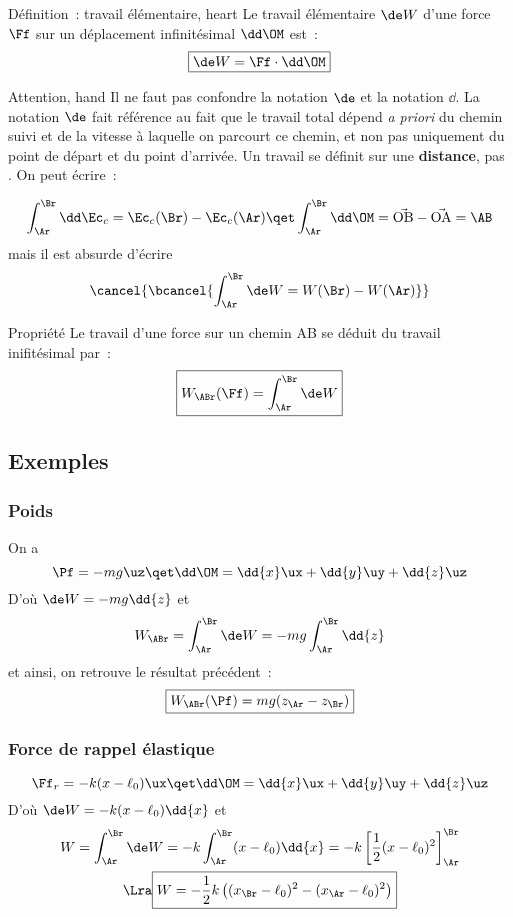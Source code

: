 \documentclass[../main/main.tex]{subfiles}
\begin{document}
\begin{tdefi}{Définition~: travail élémentaire, heart}
    Le travail élémentaire $\de W$ d'une force $\Ff$ sur un déplacement
    infinitésimal $\dd\OM$ est~:
    \[\boxed{\de W = \Ff\cdot\dd\OM}\]
\end{tdefi}

\begin{timpo}{Attention, hand}
    Il ne faut pas confondre la notation $\de$ et la notation $\dd$. \bigbreak
    La notation $\de$ fait référence au fait que le travail total dépend
    \textit{a priori} du chemin suivi et de la vitesse à laquelle on parcourt ce
    chemin, et non pas uniquement du point de départ et du point d'arrivée. Un
    travail se définit sur une \textbf{distance}, pas
    . On peut écrire~:

    \[
        \int_\Ar^\Br \dd\Ec_c = \Ec_c(\Br) - \Ec_c(\Ar)
        \qet
        \int_\Ar^\Br \dd\OM = \vec{\rm OB} - \vec{\rm OA} = \AB
    \]
    mais il est absurde d'écrire
    \[\cancel{\bcancel{
        \int_{\Ar}^{\Br} \de W = W(\Br) - W(\Ar)
        }}
    \]
\end{timpo}

\begin{tprop}{Propriété}
    Le travail d'une force sur un chemin AB se déduit du travail inifitésimal
    par~:
    \[\boxed{W_{\ABr}(\Ff) = \int_{\Ar}^{\Br} \de W}\]
\end{tprop}

\subsection{Exemples}
\subsubsection{Poids}
On a
\[
    \Pf = -mg\uz
    \qet
    \dd\OM = \dd{x}\ux + \dd{y}\uy + \dd{z}\uz
\]
D'où $\de W = -mg\dd{z}$ et
\[W_{\ABr} = \int_{\Ar}^{\Br} \de W = -mg \int_{\Ar}^{\Br} \dd{z}\]
et ainsi, on retrouve le résultat précédent~:
\[\boxed{W_{\ABr}(\Pf) = mg(z_\Ar - z_\Br)}\]

\subsubsection{Force de rappel élastique}
\[
    \Ff_r = -k(x-\ell_0)\ux
    \qet
    \dd\OM = \dd{x}\ux + \dd{y}\uy + \dd{z}\uz
\]
D'où $\de W = -k(x-\ell_0)\dd{x}$ et
\begin{gather*}
    W
        = \int_{\Ar}^{\Br} \de W
        = -k \int_{\Ar}^{\Br} (x-\ell_0)\dd{x}
        = -k \left[ \frac{1}{2}(x-\ell_0)^2 \right]_{\Ar}^{\Br}
    \\\Lra
    \boxed{W = -\frac{1}{2}k \left( (x_\Br - \ell_0)^2 - (x_\Ar
        -\ell_0)^2\right)}
\end{gather*}
\end{document}
